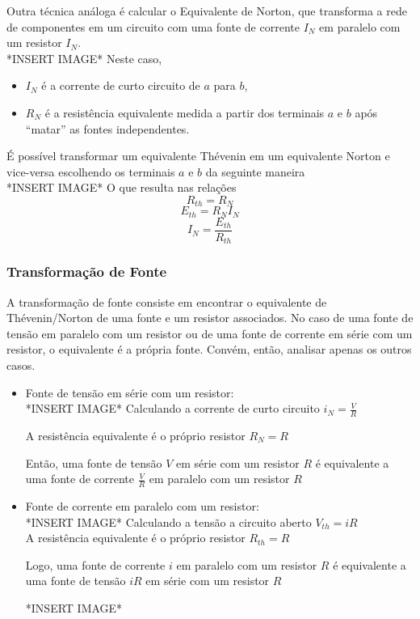 \documentclass{article}
\numberwithin{equation}{section}
\begin{document}
    Outra técnica análoga é calcular o Equivalente de Norton, que transforma a rede de componentes em um circuito com uma fonte de corrente $I_{N}$ em paralelo com um resistor $I_{N}$. \\
    *INSERT IMAGE*
    Neste caso,
    \begin{itemize}
        \item $I_{N}$ é a corrente de curto circuito de $a$ para $b$,
        \item $R_{N}$ é a resistência equivalente medida a partir dos terminais $a$ e $b$ após ``matar'' as fontes independentes.
    \end{itemize}
    É possível transformar um equivalente Thévenin em um equivalente Norton e vice-versa escolhendo os terminais $a$ e $b$ da seguinte maneira \\
    *INSERT IMAGE*
    O que resulta nas relações
    $$    R_{th}=R_{N} $$
    \begin{equation}
        E_{th}=R_{N}I_{N}
    \end{equation}
    \begin{equation}
        I_{N}=\frac{E_{th}}{R_{th}}
    \end{equation}

    \subsubsection{Transformação de Fonte}
    \label{subsubsec:transform}
    A transformação de fonte consiste em encontrar o equivalente de Thévenin/Norton de uma fonte e um resistor associados. No caso de uma fonte de tensão em paralelo com um resistor ou de uma fonte de corrente em série com um resistor, o equivalente é a própria fonte. Convém, então, analisar apenas os outros casos.
    \begin{itemize}
        \item Fonte de tensão em série com um resistor: \\
            *INSERT IMAGE* %
            Calculando a corrente de curto circuito $i_{N}=\frac{V}{R}$

            A resistência equivalente é o próprio resistor $R_{N}=R$

            Então, uma fonte de tensão $V$ em série com um resistor $R$ é equivalente a uma fonte de corrente $\frac{V}{R}$ em paralelo com um resistor $R$
        \item Fonte de corrente em paralelo com um resistor: \\
            *INSERT IMAGE*
            Calculando a tensão a circuito aberto $V_{th}=iR$ \\
            A resistência equivalente é o próprio resistor $R_{th}=R$

            Logo, uma fonte de corrente $i$ em paralelo com um resistor $R$ é equivalente a uma fonte de tensão $iR$ em série com um resistor $R$

            *INSERT IMAGE*

    \end{itemize}
\end{document}
